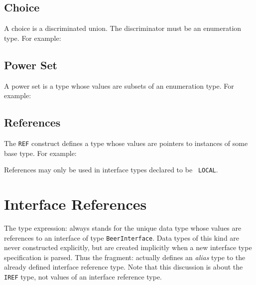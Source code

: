 \subsection{Choice}

A choice is a discriminated union. The discriminator must be an
enumeration type. For example:


\subsection{Power Set}

A power set is a type whose values are subsets of an enumeration type.
For example:

\subsection{References}

The {\tt REF} construct defines a type whose values are pointers to
instances of some base type. For example:

References may only be used in interface types declared to be {\tt
  LOCAL}.


\section{Interface References}

The type expression:
always stands for the unique data type whose values are references to
an interface of type {\tt BeerInterface}. Data types of this kind are
never constructed explicitly, but are created implicitly when a new
interface type specification is parsed. Thus the \MIDDL{} fragment:
actually defines an {\em alias} type to the already defined interface
reference type. Note that this discussion is about the {\tt IREF}
type, not values of an interface reference type.

